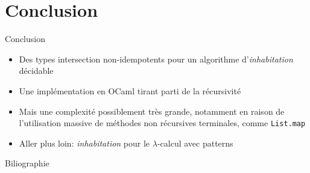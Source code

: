 \documentclass{beamer}
\begin{document}
    \section{Conclusion}
    \begin{frame}{Conclusion}
    \begin{itemize}
        \item Des types intersection non-idempotents pour un algorithme d'\emph{inhabitation} décidable
        \item Une implémentation en OCaml tirant parti de la récursivité
        \item Mais une complexité possiblement très grande, notamment en raison de l'utilisation massive de méthodes non récursives terminales, comme \texttt{List.map}
        \item Aller plus loin: \emph{inhabitation} pour le $\lambda$-calcul avec patterns
    \end{itemize}
    \end{frame}
    
    \begin{frame}{Biliographie}
    
    
    \end{frame}
    
\end{document}
